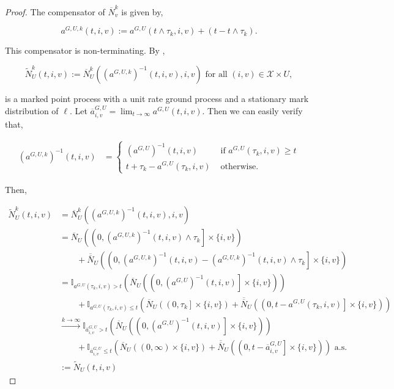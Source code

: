\documentclass[12pt]{article}
\newcommand{\mb}{\mathbb}
\newcommand{\mc}{\mathcal}
\newcommand{\ra}{\rightarrow}
\newcommand{\ov}{\overline}
\newcommand{\os}{\overset}
\newcommand{\te}{\text}
\newcommand{\defeq}{:=}								%
\newcommand{\sta}{\mc{X}}							%
\newcommand{\poiss}{N}								%
\newcommand{\Sm}{\ell}								%
\newcommand{\poissv}[1]{_{#1}}						%
\newcommand{\stpara}[1]{_{#1}}						%
\newcommand{\gvpara}[2]{^{#1,#2}}					%
\newcommand{\compen}{a}								%
\newcommand{\compenbd}{\ov{a}}						%
\newcommand{\binver}[1]{(#1)^{-1}}					%
\newcommand{\alt}[1]{\tilde{#1}}					%
\newcommand{\gvjpara}[3]{^{#1,#2,#3}}				%
\begin{document}
\begin{proof}
The compensator of \(\ov{\poiss}\poissv{v}^k\) is given by, 

\[\compen\gvjpara{G}{U}{k}(t,i,v) := \compen\gvpara{G}{U}(t\wedge \tau_k,i,v) + (t - t\wedge\tau_k).\]

This compensator is non-terminating. By \cite[Theorem 14.6.IV]{DalVer08}, 

\[\alt{\poiss}\poissv{U}^k(t,i,v) \defeq \ov{\poiss}\poissv{U}^k\left(\binver{\compen\gvjpara{G}{U}{k}}(t,i,v),i,v\right)\te{ for all }(i,v)\in \sta\times U,\]

is a marked point process with a unit rate ground process and a stationary mark distribution of \(\Sm\). Let \(\compenbd\gvpara{G}{U}\stpara{i,v} = \lim_{t\ra\infty}\compen\gvpara{G}{U}(t,i,v)\). Then we can easily verify that,

\begin{align*}
\binver{\compen\gvjpara{G}{U}{k}}(t,i,v)&= \begin{cases}
\binver{\compen\gvpara{G}{U}}(t,i,v) &\te{ if } \compen\gvpara{G}{U}(\tau_k,i,v) \geq t\\
t + \tau_k - \compen\gvpara{G}{U}(\tau_k,i,v) &\te{ otherwise.}
\end{cases}
\end{align*}

Then,

\begin{align*}
\alt{\poiss}\poissv{U}^k(t,i,v) &= \ov{\poiss}\poissv{U}^k\left(\binver{\compen\gvjpara{G}{U}{k}}(t,i,v),i,v\right)\\
&=\ov{\poiss}\poissv{U}\left(\left(0,\binver{\compen\gvjpara{G}{U}{k}}(t,i,v)\wedge\tau_k\right]\times\{i,v\}\right)\\
&\hspace{24pt} + \ov{\ov{\poiss}}\poissv{U}\left(\left(0,\binver{\compen\gvjpara{G}{U}{k}}(t,i,v)-\binver{\compen\gvjpara{G}{U}{k}}(t,i,v)\wedge\tau_k\right]\times\{i,v\}\right)\\
&=\mb{I}_{\compen\gvpara{G}{U}(\tau_k,i,v) > t}\left(\ov{\poiss}\poissv{U}\left(\left(0,\binver{\compen\gvpara{G}{U}}(t,i,v)\right]\times\{i,v\}\right)\right)\\
&\hspace{24pt} + \mb{I}_{\compen\gvpara{G}{U}(\tau_k,i,v) \leq t}\left(\ov{\poiss}\poissv{U}\left(\left(0,\tau_k\right]\times\{i,v\}\right) + \ov{\ov{\poiss}}\poissv{U}\left(\left(0,t - \compen\gvpara{G}{U}(\tau_k,i,v)\right]\times \{i,v\}\right)\right)\\
&\os{k\ra\infty}{\ra} \mb{I}_{\compenbd\gvpara{G}{U}\stpara{i,v} > t}\left(\ov{\poiss}\poissv{U}\left(\left(0,\binver{\compen\gvpara{G}{U}}(t,i,v)\right]\times\{i,v\}\right)\right)\\
&\hspace{24pt} + \mb{I}_{\compenbd\gvpara{G}{U}\stpara{i,v} \leq t}\left(\ov{\poiss}\poissv{U}\left(\left(0,\infty\right)\times\{i,v\}\right) + \ov{\ov{\poiss}}\poissv{U}\left(\left(0,t - \compenbd\gvpara{G}{U}\stpara{i,v}\right]\times\{i,v\}\right)\right)\te{ a.s.}\\
&\defeq \alt{\poiss}\poissv{U}(t,i,v)
\end{align*}


\end{proof}
\end{document}
